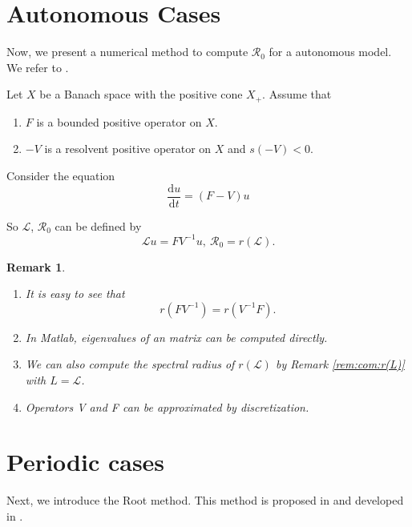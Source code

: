 \documentclass[12pt,reqno]{article}
\newtheorem{remark}{Remark}
\newcommand{\D}{\mathrm{d}}
\newcommand{\cL}{\mathcal{L}}
\newcommand{\R}{\mathcal{R}_0}
\begin{document}
\section{Autonomous Cases}\label{sec:autonomous}

Now, we present a numerical method to compute $\R$ for a autonomous model. We refer to \cite{van2002reproduction,wang2012basic}.

Let $X$ be a Banach space with the positive cone $X_+$. Assume that
\begin{enumerate}[(H1)]
\item $F$ is a bounded positive operator on $X$.
 \item  $-V$ is a resolvent positive operator on $X$ and $s(-V)<0$.
\end{enumerate}


Consider the equation
\begin{equation}
	\frac{\D u}{\D t} = (F-V)u
\end{equation}


So $\cL$, $\R$ can be defined by
\begin{equation}
\cL u = FV^{-1} u,~ \R= r(\cL).
\end{equation}
\begin{remark}
	\begin{enumerate}
	\item	It is easy to see that
	$$
	r(FV^{-1})=r(V^{-1}F).
	$$
	\item In Matlab, eigenvalues of an matrix can be computed directly. 
	\item We can also compute the spectral radius of $r(\cL)$ by Remark \ref{rem:com:r(L)} with $L= \cL$.
	 \item Operators V and F can be approximated by discretization.
 	\end{enumerate}
\end{remark}


\section{Periodic cases}\label{sec:periodic}
Next, we introduce the Root method. This method is proposed in \cite{wang2008threshold} and developed in \cite{liang2017lyme}.
\end{document}
